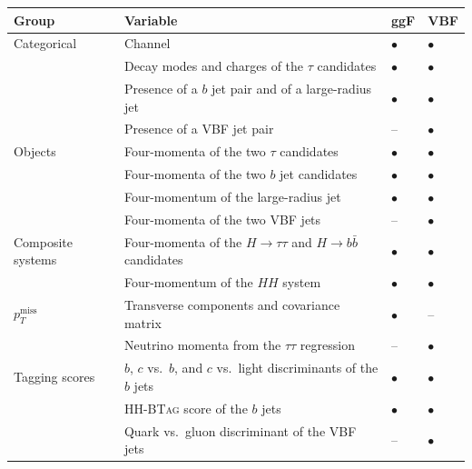 \begin{table}[tbp]
\centering
\small
\renewcommand{\arraystretch}{1.1}
\begin{tabular}{@{}ll>{\centering\arraybackslash}p{1.1cm}>{\centering\arraybackslash}p{1.1cm}@{}}
\toprule
Group & Variable & ggF & VBF \\
\midrule
Categorical       & Channel                                                      & $\bullet$ & $\bullet$ \\
                  & Decay modes and charges of the $\tau$ candidates             & $\bullet$ & $\bullet$ \\
                  & Presence of a $b$ jet pair and of a large-radius jet         & $\bullet$ & $\bullet$ \\
                  & Presence of a VBF jet pair                                   & --        & $\bullet$ \\
\midrule
Objects           & Four-momenta of the two $\tau$ candidates                    & $\bullet$ & $\bullet$ \\
                  & Four-momenta of the two $b$ jet candidates                   & $\bullet$ & $\bullet$ \\
                  & Four-momentum of the large-radius jet                        & $\bullet$ & $\bullet$ \\
                  & Four-momenta of the two VBF jets                             & --        & $\bullet$ \\
\midrule
Composite systems & Four-momenta of the $H\to\tau\tau$ and $H\to b\bar{b}$ candidates & $\bullet$ & $\bullet$ \\
                  & Four-momentum of the $HH$ system                             & $\bullet$ & $\bullet$ \\
\midrule
$p_T^\text{miss}$ & Transverse components and covariance matrix                  & $\bullet$ & --        \\
                  & Neutrino momenta from the $\tau\tau$ regression              & --        & $\bullet$ \\
\midrule
Tagging scores    & $b$, $c$ vs.\ $b$, and $c$ vs.\ light discriminants of the $b$ jets & $\bullet$ & $\bullet$ \\
                  & \textsc{HH-BTag} score of the $b$ jets                       & $\bullet$ & $\bullet$ \\
                  & Quark vs.\ gluon discriminant of the VBF jets                & --        & $\bullet$ \\

\end{tabular}
\end{table}
